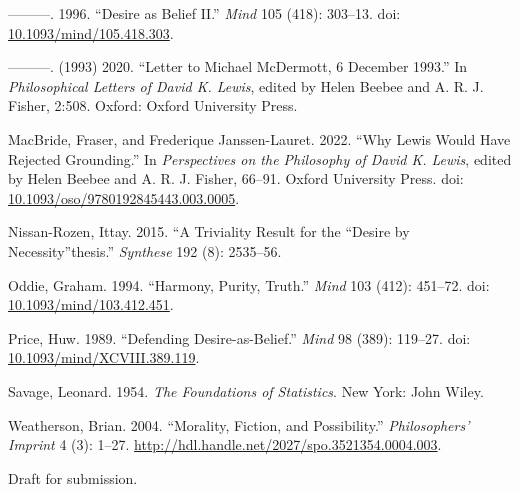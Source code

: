 \documentclass[
  11pt,
  letterpaper,
  DIV=11,
  numbers=noendperiod,
  twoside]{scrartcl}
\newlength{\cslhangindent}
\newenvironment{CSLReferences}[2] %
 {\begin{list}{}{%
  \setlength{\itemindent}{0pt}
  \setlength{\leftmargin}{0pt}
  \setlength{\parsep}{0pt}
  \ifodd #1
   \setlength{\leftmargin}{\cslhangindent}
   \setlength{\itemindent}{-1\cslhangindent}
  \fi
  \setlength{\itemsep}{#2\baselineskip}}}
 {\end{list}}
\begin{document}
\begin{CSLReferences}{1}{0}
---------. 1996. {``Desire as Belief {II}.''} \emph{Mind} 105 (418):
303--13. doi:
\href{https://doi.org/10.1093/mind/105.418.303}{10.1093/mind/105.418.303}.

---------. (1993) 2020. {``Letter to Michael McDermott, 6 December
1993.''} In \emph{Philosophical Letters of David {K}. Lewis}, edited by
Helen Beebee and A. R. J. Fisher, 2:508. Oxford: Oxford University
Press.

MacBride, Fraser, and Frederique Janssen-Lauret. 2022. {``Why Lewis
Would Have Rejected Grounding.''} In \emph{Perspectives on the
Philosophy of {D}avid {K}. {L}ewis}, edited by Helen Beebee and A. R. J.
Fisher, 66--91. {O}xford {U}niversity {P}ress. doi:
\href{https://doi.org/10.1093/oso/9780192845443.003.0005}{10.1093/oso/9780192845443.003.0005}.

Nissan-Rozen, Ittay. 2015. {``A Triviality Result for the ``Desire by
Necessity''thesis.''} \emph{Synthese} 192 (8): 2535--56.

Oddie, Graham. 1994. {``Harmony, Purity, Truth.''} \emph{Mind} 103
(412): 451--72. doi:
\href{https://doi.org/10.1093/mind/103.412.451}{10.1093/mind/103.412.451}.

Price, Huw. 1989. {``Defending Desire-as-Belief.''} \emph{Mind} 98
(389): 119--27. doi:
\href{https://doi.org/10.1093/mind/XCVIII.389.119}{10.1093/mind/XCVIII.389.119}.

Savage, Leonard. 1954. \emph{The Foundations of Statistics}. New York:
John Wiley.

Weatherson, Brian. 2004. {``{Morality, Fiction, and Possibility}.''}
\emph{Philosophers' Imprint} 4 (3): 1--27.
\url{http://hdl.handle.net/2027/spo.3521354.0004.003}.

\end{CSLReferences}



\noindent Draft for submission.
\end{document}
